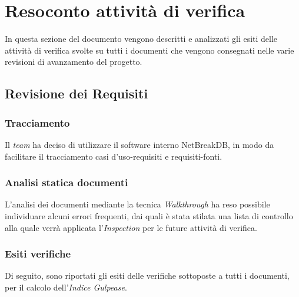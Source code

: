 \newpage
\section{Resoconto attività di verifica}
In questa sezione del documento vengono descritti e analizzati gli esiti delle attività di verifica svolte su tutti i documenti che vengono consegnati nelle varie revisioni di avanzamento del progetto.
	
	\subsection{Revisione dei Requisiti}
			
		\subsubsection{Tracciamento}
		Il \textit{team} ha deciso di utilizzare il software interno NetBreakDB, in modo da facilitare il tracciamento casi d’uso-requisiti e requisiti-fonti.
			
		\subsubsection{Analisi statica documenti}
		L’analisi dei documenti mediante la tecnica \textit{Walkthrough} ha reso possibile individuare alcuni errori frequenti, dai quali è stata stilata una lista di controllo alla quale verrà applicata l’\textit{Inspection} per le future attività di verifica.
			
		\subsubsection{Esiti verifiche}
		Di seguito, sono riportati gli esiti delle verifiche sottoposte a tutti i documenti, per il calcolo dell’\textit{Indice Gulpease}.
	
